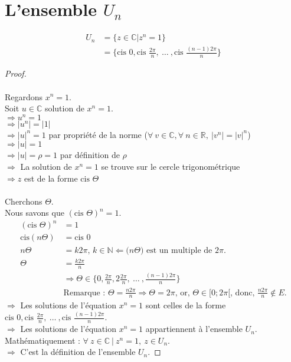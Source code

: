 \documentclass[]{article}
\newcommand{\cis}{\text{cis }}
\newcommand{\cisns}{\text{cis}}
\begin{document}
\section{L'ensemble $U_n$}
\noindent
\begin{align*}
U_n &= \{z \in \mathbb{C} | z^n = 1\}
\\  &= \{\cis{0}, \cis{\frac{2\pi}{n}}, \ \hdots \ , \cis{\frac{(n-1)2\pi}{n}} \}
\end{align*}
\begin{proof} \
\\
\\ Regardons $x^n = 1$.
\\ Soit $u \in \mathbb{C}$ solution de $x^n = 1$.
\\ $\Rightarrow u^n = 1$
\\ $\Rightarrow |u^n| = |1|$
\\ $\Rightarrow |u|^n = 1$ par propriété de la norme ($\forall \ v \in \mathbb{C}, \forall \ n \in \mathbb{R}, \ |v^n| = |v|^n$)
\\ $\Rightarrow |u| = 1$
\\ $\Rightarrow |u| = \rho = 1$ par définition de $\rho$
\\ $\Rightarrow$ La solution de $x^n = 1$ se trouve sur le cercle trigonométrique
\\ $\Rightarrow z $ est de la forme $\cis{\Theta}$ 
\\
\\ Cherchons $\Theta$.
\\ Nous savons que $(\cis{\Theta})^n = 1$.
\begin{align*}
(\cis{\Theta})^n &= 1
\\ \cisns{(n\Theta)} &= \cis{0}
\\ n\Theta &= k2\pi \text{, } k \in \mathbb{N} \Leftarrow \text{(} n\Theta \text{) est un multiple de } 2\pi \text{.}
\\ \Theta &= \frac{k2\pi}{n}
\\ &\Rightarrow \Theta \in \{ 0, \frac{2\pi}{n}, 2\frac{2\pi}{n}, \ \hdots \ , \frac{(n-1)2\pi}{n}  \}
\\ & \text{Remarque : } \Theta = \frac{n2\pi}{n} \Rightarrow \Theta = 2\pi \text{, or, } \Theta \in [0; 2\pi[ \text{, donc, } \frac{n2\pi}{n} \not\in E \text{.}
\end{align*}
$\Longrightarrow$ Les solutions de l'équation $x^n = 1$ sont celles de la forme $\cis{0}, \cis{\frac{2\pi}{n}}, \ \hdots \ , \cis{\frac{(n-1)2\pi}{n}}$.
\\ $\Longrightarrow$ Les solutions de l'équation $x^n = 1$ appartiennent à l'ensemble $U_n$.
\\ Mathématiquement : $\forall \ z \in \mathbb{C} \ | \ z^n = 1, \ z \in U_n$.
\\ $\Longrightarrow$ C'est la définition de l'ensemble $U_n$.
\end{proof}
\end{document}

